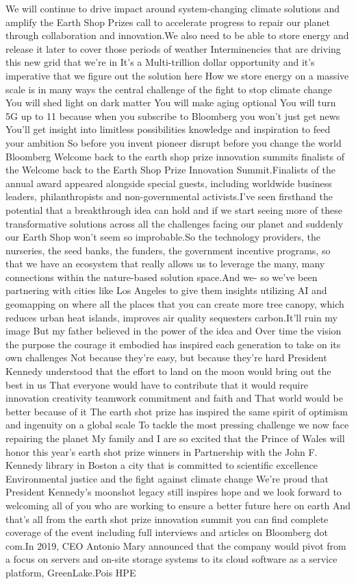 \documentclass{article}%
\begin{document}
We will continue to drive impact around system{-}changing climate solutions and amplify the Earth Shop Prizes call to accelerate progress to repair our planet through collaboration and innovation.We also need to be able to store energy and release it later to cover those periods of weather Interminencies that are driving this new grid that we're in It's a Multi{-}trillion dollar opportunity and it's imperative that we figure out the solution here How we store energy on a massive scale is in many ways the central challenge of the fight to stop climate change You will shed light on dark matter You will make aging optional You will turn 5G up to 11 because when you subscribe to Bloomberg you won't just get news You'll get insight into limitless possibilities knowledge and inspiration to feed your ambition So before you invent pioneer disrupt before you change the world Bloomberg Welcome back to the earth shop prize innovation summits finalists of the  Welcome back to the Earth Shop Prize Innovation Summit.Finalists of the annual award appeared alongside special guests, including worldwide business leaders, philanthropists and non{-}governmental activists.I've seen firsthand the potential that a breakthrough idea can hold and if we start seeing more of these transformative solutions across all the challenges facing our planet and suddenly our Earth Shop won't seem so improbable.So the technology providers, the nurseries, the seed banks, the funders, the government incentive programs, so that we have an ecosystem that really allows us to leverage the many, many connections within the nature{-}based solution space.And we{-} so we've been partnering with cities like Los Angeles to give them insights utilizing AI and geomapping on where all the places that you can create more tree canopy, which reduces urban heat islands, improves air quality sequesters carbon.It'll ruin my image But my father believed in the power of the idea and Over time the vision the purpose the courage it embodied has inspired each generation to take on its own challenges Not because they're easy, but because they're hard President Kennedy understood that the effort to land on the moon would bring out the best in us That everyone would have to contribute that it would require innovation creativity teamwork commitment and faith and That world would be better because of it The earth shot prize has inspired the same spirit of optimism and ingenuity on a global scale To tackle the most pressing challenge we now face repairing the planet My family and I are so excited that the Prince of Wales will honor this year's earth shot prize winners in Partnership with the John F. Kennedy library in Boston a city that is committed to scientific excellence Environmental justice and the fight against climate change We're proud that President Kennedy's moonshot legacy still inspires hope and we look forward to welcoming all of you who are working to ensure a better future here on earth And that's all from the earth shot prize innovation summit you can find complete coverage of the event including full interviews and articles on Bloomberg dot com.In 2019, CEO Antonio Mary announced that the company would pivot from a focus on servers and on{-}site storage systems to its cloud software as a service platform, GreenLake.Pois HPE 
\end{document}

